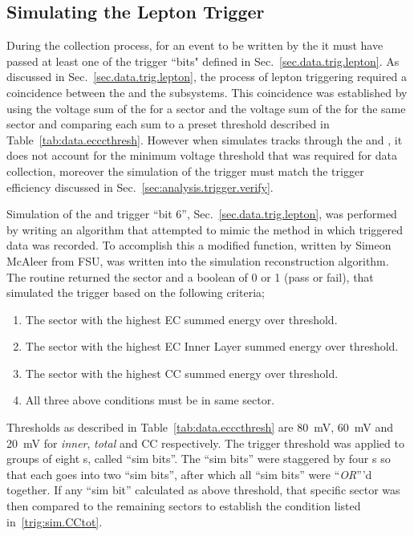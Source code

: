 \subsection{Simulating the Lepton Trigger}\label{sec:analysis.accept.trigger}
During the collection process, for an event to be written by the  it must have passed at least one of the trigger ``bits" defined in Sec.~\ref{sec.data.trig.lepton}. As discussed in Sec.~\ref{sec.data.trig.lepton}, the process of lepton triggering required a coincidence between the  and the  subsystems. This coincidence was established by using the voltage sum of the  for a sector and the voltage sum of the  for the same sector and comparing each sum to a preset threshold described in Table~\ref{tab:data.ecccthresh}. However when  simulates tracks through the  and , it does not account for the minimum voltage threshold that was required for data collection, moreover the simulation of the trigger must match the trigger efficiency discussed in Sec.~\ref{sec:analysis.trigger.verify}.

Simulation of the  and  trigger ``bit 6'', Sec.~\ref{sec.data.trig.lepton}, was performed by writing an algorithm that attempted to mimic the method in which triggered data was recorded. To accomplish this a modified function, written by Simeon McAleer from FSU, was written into the simulation reconstruction algorithm. The routine returned the sector and a boolean of 0 or 1 (pass or fail), that simulated the trigger based on the following criteria;
\begin{enumerate}\label{trig:sim.all}
	\item The sector with the highest EC summed energy over threshold. \label{trig:sim.ECtot} 
	\item The sector with the highest EC Inner Layer summed energy over threshold. \label{trig:sim.ECinner} 
	\item The sector with the highest CC summed energy over threshold. \label{trig:sim.CCtot} 
	\item All three above conditions must be in same sector.
\end{enumerate}
Thresholds as described in Table~\ref{tab:data.ecccthresh} are 80~mV, 60~mV and 20~mV for  \emph{inner}, \emph{total} and CC respectively. The  trigger threshold was applied to groups of eight  s, called ``sim bits''. The ``sim bits'' were staggered by four s so that each  goes into two ``sim bits'', after which all ``sim bits'' were ``\emph{OR}'''d together. If any ``sim bit'' calculated as above threshold, that specific sector was then compared to the remaining sectors to establish the condition listed in~\ref{trig:sim.CCtot}.

